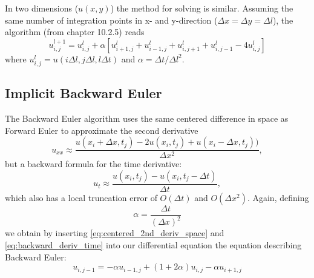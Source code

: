 \documentclass[reprint, english,notitlepage,nofootinbib]{revtex4-1}  %
\begin{document}
In two dimensions ($u(x,y)$) the method for solving is similar. Assuming the same number of integration points in x- and y-direction ($\Delta x = \Delta y = \Delta l$), the algorithm (from \cite{lectures2015} chapter 10.2.5) reads
\begin{equation}
	\label{eq:3dEuler}
	u_{i,j}^{l+1} = u_{i,j}^{l} + \alpha \left[u_{i+1,j}^{l} + u_{i-1,j}^{l} + u_{i,j+1}^{l} + u_{i,j-1}^{l} - 4u_{i,j}^{l}\right]
\end{equation}
where $u_{i,j}^l = u(i\Delta l, j \Delta l, l\Delta t)$ and $\alpha = \Delta t/\Delta l^2$.


\subsection*{Implicit Backward Euler}

The Backward Euler algorithm uses the same centered difference in space as Forward Euler to approximate the second derivative
\begin{equation}
  \label{eq:centered_2nd_deriv_space}
	u_{xx} \approx \frac{u(x_i + \Delta x, t_j) - 2u(x_i,t_j) + u(x_i-\Delta x, t_j))}{\Delta x^2},
\end{equation}
but a backward formula for the time derivative:
\begin{equation}
  \label{eq:backward_deriv_time}
  u_t \approx \frac{u(x_i, t_j) - u(x_i, t_j - \Delta t)}{\Delta t},
\end{equation}
which also has a local truncation error of $O(\Delta t)$ and $O(\Delta x ^2)$.
Again, defining
\begin{equation*}
  \alpha = \frac{\Delta t}{(\Delta x)^2}
\end{equation*}
we obtain by inserting \eqref{eq:centered_2nd_deriv_space} and \eqref{eq:backward_deriv_time} into our differential equation the equation describing Backward Euler:
\begin{equation}
  \label{eq:backward_euler}
  u_{i, j-1} = -\alpha u_{i-1, j} + (1 + 2 \alpha) u_{i, j} - \alpha u_{i+1, j}
\end{equation}
\end{document}
